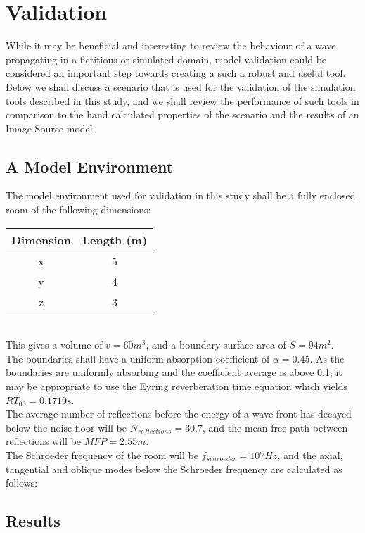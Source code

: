 %
%
%
\chapter{Validation}
\label{Introduction}
While it may be beneficial and interesting to review the behaviour of a wave propagating in a fictitious or simulated domain, model validation could be considered an important step towards creating a such a robust and useful tool. Below we shall discuss a scenario that is used for the validation of the simulation tools described in this study, and we shall review the performance of such tools in comparison to the hand calculated properties of the scenario and the results of an Image Source model.  

\section{A Model Environment}
The model environment used for validation in this study shall be a fully enclosed room of the following dimensions:\\
\begin{tabular}{|c|c|} 
  \hline
 Dimension & Length (m) \\
 \hline
 x & 5 \\ 
 y & 4 \\  
 z & 3 \\  
 \hline
\end{tabular}\\
This gives a volume of $ v = 60m^3$, and a boundary surface area of $S = 94m^2$.\\
The boundaries shall have a uniform absorption coefficient of $\alpha = 0.45 $. As the boundaries are uniformly absorbing and the coefficient average is above 0.1, it may be appropriate to use the Eyring reverberation time equation which yields $RT_{60} = 0.1719s $.\\
The average number of reflections before the energy of a wave-front has decayed below the noise floor will be $N_{reflections} = 30.7$, and the mean free path between reflections will be $MFP = 2.55m$.\\
The Schroeder frequency of the room will be $f_{schroeder} = 107Hz $, and the axial, tangential and oblique modes below the Schroeder frequency are calculated as follows:\\

\section{Results}




